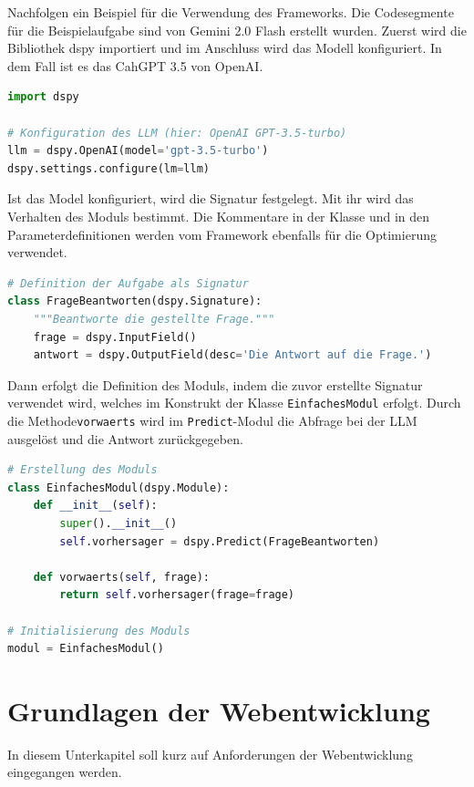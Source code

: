Nachfolgen ein Beispiel für die Verwendung des Frameworks. Die Codesegmente für die Beispielaufgabe sind von Gemini 2.0 Flash erstellt wurden. Zuerst wird die Bibliothek dspy importiert und im Anschluss wird das Modell konfiguriert. In dem Fall ist es das CahGPT 3.5 von OpenAI.

\begin{lstlisting}[language=python]
import dspy

# Konfiguration des LLM (hier: OpenAI GPT-3.5-turbo)
llm = dspy.OpenAI(model='gpt-3.5-turbo')
dspy.settings.configure(lm=llm)
\end{lstlisting}

Ist das Model konfiguriert, wird die Signatur festgelegt. Mit ihr wird das Verhalten des Moduls bestimmt. Die Kommentare in der Klasse und in den Parameterdefinitionen werden vom Framework ebenfalls für die Optimierung verwendet.

\begin{lstlisting}[language=python]
# Definition der Aufgabe als Signatur
class FrageBeantworten(dspy.Signature):
    """Beantworte die gestellte Frage."""
    frage = dspy.InputField()
    antwort = dspy.OutputField(desc='Die Antwort auf die Frage.')
\end{lstlisting}

Dann erfolgt die Definition des Moduls, indem die zuvor erstellte Signatur verwendet wird, welches im Konstrukt der Klasse \texttt{EinfachesModul} erfolgt. Durch die Methode\texttt{vorwaerts} wird im \texttt{Predict}-Modul die Abfrage bei der LLM ausgelöst und die Antwort zurückgegeben.

\begin{lstlisting}[language=python]
# Erstellung des Moduls
class EinfachesModul(dspy.Module):
    def __init__(self):
        super().__init__()
        self.vorhersager = dspy.Predict(FrageBeantworten)

    def vorwaerts(self, frage):
        return self.vorhersager(frage=frage)

# Initialisierung des Moduls
modul = EinfachesModul()
\end{lstlisting}



\section{Grundlagen der Webentwicklung}
In diesem Unterkapitel soll kurz auf Anforderungen der Webentwicklung eingegangen werden.


